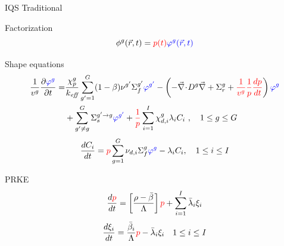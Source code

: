 \documentclass[8pt,xcolor=dvipnames]{beamer}
\renewcommand{\div}{\vec{\nabla}\! \cdot \!}
\newcommand{\grad}{\vec{\nabla}}
\newcommand{\be}{\begin{equation*}}
\newcommand{\ee}{\end{equation*}}
\newcommand{\keff}{\ensuremath{k_{\textit{eff}}}}
\newcommand{\tcr}[1]{\textcolor{red}{#1}}
\newcommand{\tcb}[1]{\textcolor{blue}{#1}}
\begin{document}
\begin{frame}{IQS Traditional}

\vspace{-3mm}

\begin{block}{Factorization}
\begin{equation*}
\phi^g(\vec{r},t) = \tcr{p(t)} \tcb{\varphi^g(\vec{r},t)}
\end{equation*}
\end{block}

\vspace{-2mm}

\begin{block}{Shape equations}
\begin{align*}
\frac{1}{v^g} \frac{\partial \tcb{\varphi^g} }{\partial t} =& \frac{\chi_p^g}{\keff} \sum_{g'=1}^G (1-\beta) \nu^{g'} \Sigma_f^{g'} \tcb{\varphi^{g'}} -  \left( -\div D^g \grad  + \Sigma_r^g + \tcr{\frac{1}{v^g}}\tcr{\frac{1}{p}}\tcr{\frac{dp}{dt}}\right) \tcb{\varphi^g}  \nonumber \\
&  + \sum_{g'\neq g}^G\Sigma_s^{g'\to g} \tcb{\varphi^{g'}}  + \tcr{\frac{1}{p}}\sum_{i=1}^I\chi_{d,i}^g\lambda_i C_i \ , \quad 1 \le g \le G 
\end{align*}
\begin{equation*}
\frac{dC_i}{dt} = \tcr{p}\sum_{g=1}^G \nu_{d,i} \Sigma_f^g \tcb{\varphi^{g}} - \lambda_iC_i , \quad 1 \le i \le I
\end{equation*}
\end{block}

\vspace{-2mm}

\begin{block}{PRKE}
\[
\frac{d\tcr{p}}{dt}=\left[\frac{\rho-\bar{\beta}}{\Lambda}\right]\tcr{p}+\sum_{i=1}^I\bar{\lambda}_i\xi_i
\]
\[
\frac{d\xi_i}{dt}=\frac{\bar{\beta}_i}{\Lambda}\tcr{p} - \bar{\lambda}_i\xi_i \quad 1 \le i \le I 
\]
\end{block}

\end{frame}
\end{document}
